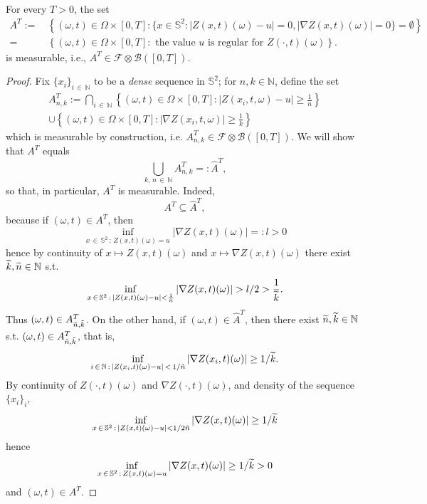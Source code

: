 \documentclass[AHL,Unicode,longabstracts,published]{cedram}
\newcommand{\clF}{\mathcal{F}}
\newcommand{\clB}{\mathcal{B}}
\newcommand{\bbS}{\mathbb{S}}
\newcommand{\bbN}{\mathbb{N}}
\let\oldtilde\tilde
\renewcommand*{\tilde}[1]{\mathchoice{\widetilde{#1}}{\widetilde{#1}}{\oldtilde{#1}}{\oldtilde{#1}}}
\begin{document}
\begin{lemm}\label{lemmeas}
For every $T>0$, the set
\begin{align*}
A^T {:=}&\, \left \{ (\omega, t)\in \Omega\times [0,T]: \{ x\in
\bbS^2 : |Z(x,t)(\omega) - u | =0, |\nabla Z(x,t)(\omega) |=0\} =\emptyset \right \} \\
=&\,\left\{ (\omega, t)\in \Omega \times [0,T] : \text{ the value } u \text{ is regular for } Z(\cdot, t)(\omega)\right\}.
\end{align*}
is measurable, i.e., $A^T\in \clF\otimes \clB([0,T])$.
\end{lemm}

\begin{proof}
Fix $\{x_i\}_{i\,\in\,\bbN}$ to be a \emph{dense} sequence in $\bbS^2$; for $n,k\in \bbN$, define the set
\begin{multline}
A^T_{n,k}:= \bigcap_{i\,\in\,\bbN} \left\{ (\omega, t)\in \Omega\times [0,T]: |Z(x_i, t, \omega) - u | \ge \frac{1}{n} \right \} \\
\cup \left \{(\omega, t)\in \Omega\times [0,T] : |\nabla Z(x_i, t, \omega)| \ge \frac{1}{k} \right \}
\end{multline}
which is measurable by construction, i.e. $A^T_{n,k}\in \mathcal F\otimes \mathcal B([0,T])$. We will show that $A^T$ equals
\begin{equation}
\bigcup_{k,\,n\,\in\,\bbN} A^T_{n,k} =: \widehat A^T,
\end{equation}
so that, in particular, $A^T$ is measurable. Indeed,
\begin{equation}
A^T\subseteq \widehat A^T,
\end{equation}
because if $(\omega,t)\in A^T$, then
\begin{equation}
\inf_{x\,\in\,\bbS^2\,:\,Z(x,t)(\omega)=u} |\nabla Z(x,t)(\omega)| =: l >0
\end{equation}
hence by continuity of $x\mapsto Z(x,t)(\omega)$ and $x\mapsto \nabla Z(x,t)(\omega)$ there exist $\tilde k, \tilde n\in \bbN$ s.t.
\begin{equation}
\inf_{x\,\in\,\bbS^2\,:\,|Z(x,t)(\omega) - u| < \frac{1}{\tilde n}} |\nabla Z(x,t)(\omega)| > l/2 > \frac{1}{\tilde k}.
\end{equation}
Thus $(\omega,t)\in A^T_{\tilde n, \tilde k}$. On the other hand, if $(\omega,t)\in \widehat A^T$, then there exist $\tilde n, \tilde k\in \bbN$ s.t. $(\omega,t)\in A^T_{\tilde n, \tilde k}$, that is,
\begin{equation}
\inf_{i\,\in\,\bbN\,:\,|Z(x_i, t)(\omega) - u|\,<\,1/\tilde n} |\nabla Z(x_i, t)(\omega) | \ge 1/\tilde k.
\end{equation}
By continuity of $Z(\cdot,t)(\omega)$ and $\nabla Z(\cdot, t)(\omega)$, and density of the sequence $\{ x_i\}_i$,
\begin{equation}
\inf_{x\,\in\,\bbS^2\,:\,|Z(x, t)(\omega) - u|< 1/2\tilde n} |\nabla Z(x, t)(\omega) | \ge 1/\tilde k
\end{equation}
hence
\begin{equation}
\inf_{x\,\in\,\bbS^2\,:\,Z(x, t)(\omega) = u} |\nabla Z(x, t)(\omega) | \ge 1/\tilde k >0
\end{equation}
and $(\omega,t)\in A^T$.
\end{proof}
\end{document}
